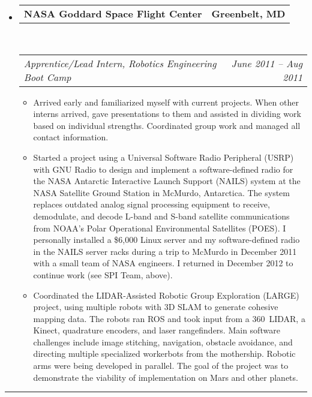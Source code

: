 \documentclass[10pt,letterpaper]{article}
\makeatletter
\newcommand{\headerrow}[2]
{\begin{tabular*}{\linewidth}{l@{\extracolsep{\fill}}r}
	#1 &
	#2 \\
\end{tabular*}}
\makeatother
\begin{document}
\begin{itemize}
	\item
	\headerrow
		{\textbf{NASA Goddard Space Flight Center}}
		{\textbf{Greenbelt, MD}}
	\\
	\headerrow
		{\emph{Apprentice/Lead Intern, Robotics Engineering Boot Camp}}
		{\emph{June 2011 -- Aug 2011}}
	\begin{itemize}
		\item Arrived early and familiarized myself with current projects.  When other interns arrived, gave presentations to them and assisted in dividing work based on individual strengths.  Coordinated group work and managed all contact information.
		\item Started a project using a Universal Software Radio Peripheral (USRP) with GNU Radio to design and implement a software-defined radio for the NASA Antarctic Interactive Launch Support (NAILS) system at the NASA Satellite Ground Station in McMurdo, Antarctica.  The system replaces outdated analog signal processing equipment to receive, demodulate, and decode L-band and S-band satellite communications from NOAA's Polar Operational Environmental Satellites (POES).  I personally installed a \$6,000 Linux server and my software-defined radio in the NAILS server racks during a trip to McMurdo in December 2011 with a small team of NASA engineers.  I returned in December 2012 to continue work (see SPI Team, above).
		\item Coordinated the LIDAR-Assisted Robotic Group Exploration (LARGE) project, using multiple robots with 3D SLAM to generate cohesive mapping data.  The robots ran ROS and took input from a 360\degree\ LIDAR, a Kinect, quadrature encoders, and laser rangefinders.  Main software challenges include image stitching, navigation, obstacle avoidance, and directing multiple specialized workerbots from the mothership.  Robotic arms were being developed in parallel.  The goal of the project was to demonstrate the viability of implementation on Mars and other planets.
	\end{itemize}

\end{itemize}

\hrule
\vspace{-0.4em}
\end{document}
